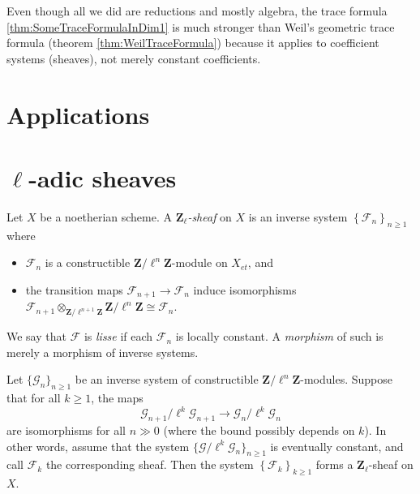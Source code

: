 \begin{remark}
Even though all we did are reductions and mostly algebra, the trace formula 
\ref{thm:SomeTraceFormulaInDim1} is much stronger than Weil's geometric trace 
formula (theorem \ref{thm:WeilTraceFormula}) because it applies to coefficient 
systems (sheaves), not merely constant coefficients. 
\end{remark}

\section{Applications}


\section{$\ell$-adic sheaves}

\begin{definition}
Let $X$ be a noetherian scheme. A \emph{$\mathbf{Z}_\ell$-sheaf} on $X$ is an 
inverse system $\left\{\mathcal{F}_n\right\}_{n\geq 1}$ where
\begin{itemize}
\item 
$\mathcal{F}_n$ is a constructible $\mathbf{Z}/\ell^n\mathbf{Z}$-module on 
$X_{et}$, and
\item 
the transition maps $\mathcal{F}_{n+1}\to \mathcal{F}_n$ induce isomorphisms 
$\mathcal{F}_{n+1}\otimes_{\mathbf{Z}/\ell^{n+1}\mathbf{Z}} 
\mathbf{Z}/\ell^n\mathbf{Z} \cong \mathcal{F}_n$.
\end{itemize}
We say that $\mathcal{F}$ is \emph{lisse} if each $\mathcal{F}_n$ is locally 
constant. A \emph{morphism} of such is merely a morphism of inverse systems.
\end{definition}

\begin{lemma} \label{lem:EventuallyCstInverseSystems}
Let $\{\mathcal{G}_n\}_{n\geq 1}$ be an inverse system of constructible 
$\mathbf{Z}/\ell^n\mathbf{Z}$-modules. Suppose that for all $k\geq 1$, the maps
$$
\mathcal{G}_{n+1}/\ell^k \mathcal{G}_{n+1}\to \mathcal{G}_n /\ell^k 
\mathcal{G}_n
$$
are isomorphisms for all $n\gg 0$ (where the bound possibly depends on $k$). In 
other words, assume that the system $\{\mathcal{G}/\ell^k\mathcal{G}_n\}_{n\geq 
1}$ is eventually constant, and call $\mathcal{F}_k$ the corresponding sheaf. 
Then the system $\left\{\mathcal{F}_k\right\}_{k\geq 1}$ forms a 
$\mathbf{Z}_\ell$-sheaf on $X$.
\end{lemma}

